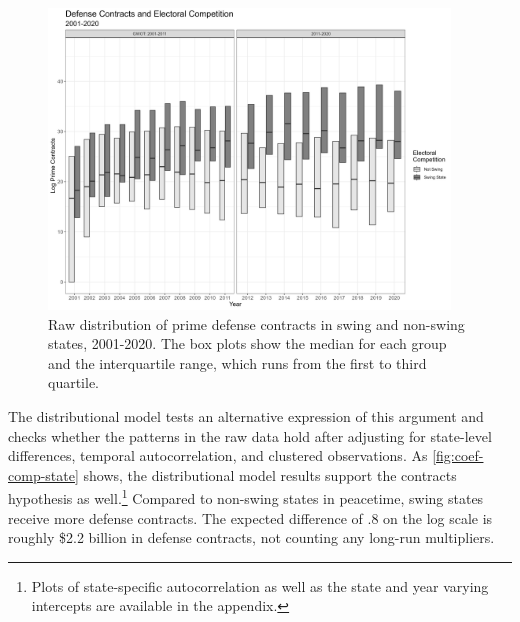 \documentclass[12pt]{article}
\begin{document}
\begin{figure}[htpb]
	\centering
		\includegraphics[width=0.95\textwidth]{../figures/raw-comp-state.png}
	\caption{Raw distribution of prime defense contracts in swing and non-swing states, 2001-2020. The box plots show the median for each group and the interquartile range, which runs from the first to third quartile.}
	\label{fig:raw-comp-state}
\end{figure}


The distributional model tests an alternative expression of this argument and checks whether the patterns in the raw data hold after adjusting for state-level differences, temporal autocorrelation, and clustered observations.
As \autoref{fig:coef-comp-state} shows, the distributional model results support the contracts hypothesis as well.\footnote{Plots of state-specific autocorrelation as well as the state and year varying intercepts are available in the appendix.}
Compared to non-swing states in peacetime, swing states receive more defense contracts.
The expected difference of .8 on the log scale is roughly \$2.2 billion in defense contracts, not counting any long-run multipliers. 
\end{document}
